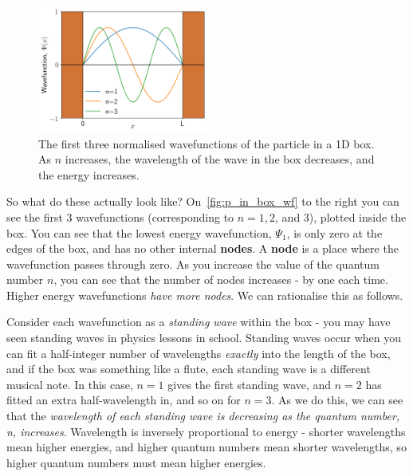 \documentclass{memoir}[11pt,oneside,a4paper,openany]
\newcommand{\wf}{\ensuremath{\Psi}\xspace}
\begin{document}
\begin{figure}
	\includegraphics[width=0.5\textwidth]{particle_in_box_wf.png}
	\caption{The first three normalised wavefunctions of the particle in a 1D box. As $n$ increases, the wavelength of the wave in the box decreases, and the energy increases.}\label{fig:p_in_box_wf}
\end{figure}
So what do these actually look like? On~\autoref{fig:p_in_box_wf} to the right you can see the first 3 wavefunctions (corresponding to $n=1,2$, and $3$), plotted inside the box. You can see that the lowest energy wavefunction, $\wf_1$, is only zero at the edges of the box, and has no other internal \textbf{nodes}. A \textbf{node} is a place where the wavefunction passes through zero. As you increase the value of the quantum number $n$, you can see that the number of nodes increases - by one each time. Higher energy wavefunctions \emph{have more nodes}. We can rationalise this as follows.

Consider each wavefunction as a \emph{standing wave} within the box - you may have seen standing waves in physics lessons in school. Standing waves occur when you can fit a half-integer number of wavelengths \emph{exactly} into the length of the box, and if the box was something like a flute, each standing wave is a different musical note. In this case, $n=1$ gives the first standing wave, and $n=2$ has fitted an extra half-wavelength in, and so on for $n=3$. As we do this, we can see that the \emph{wavelength of each standing wave is decreasing as the quantum number, n, increases}. Wavelength is inversely proportional to energy - shorter wavelengths mean higher energies, and higher quantum numbers mean shorter wavelengths, so higher quantum numbers must mean higher energies. 
\end{document}
